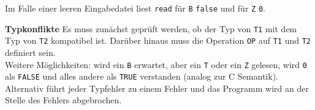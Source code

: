 \documentclass[ngerman,a4paper]{report}
\begin{document}
\begin{compactenum}
	Im Falle einer leeren Eingabedatei liest \lstinline!read! für \lstinline!B! \lstinline!false! und für \lstinline!Z! \lstinline!0!.
\item [\textbf{Typkonflikte}] Es muss zunächst geprüft werden, ob der Typ von \lstinline!T1! mit dem Typ von \lstinline!T2! kompatibel ist. Darüber hinaus muss die Operation \lstinline!OP! auf \lstinline!T1! und \lstinline!T2! definiert sein.\\
Weitere Möglichkeiten: wird ein \lstinline!B! erwartet, aber ein \lstinline!T! oder ein \lstinline!Z! gelesen, wird \lstinline!0! als \lstinline!FALSE! und alles andere als \lstinline!TRUE! verstanden (analog zur C Semantik). Alternativ führt jeder Typfehler zu einem Fehler und das Programm wird an der Stelle des Fehlers abgebrochen.
\end{compactenum}
\end{document}
